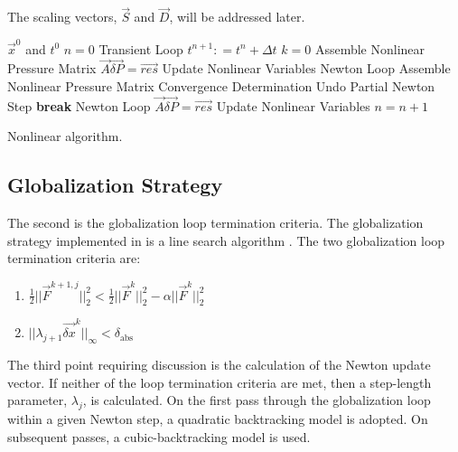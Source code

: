 The scaling vectors, $\vec{S}$ and $\vec{D}$, will be addressed later.


\begin{algo}[h!]
\setlength{\baselineskip}{0.625\baselineskip}
\begin{algorithmic}[1]
\Require $\vec{x}^{0}$ and $t^{0}$
\Set $n = 0$
\Loop \; Transient Loop
    \Set $t^{n+1} : = t^{n} + \Delta t$
    \Set $k = 0$
	\Algorithm Assemble Nonlinear Pressure Matrix	 
	\Solve $\vec{A} \vec{\delta P} = \vec{res}$
	\Algorithm Update Nonlinear Variables  
    \Loop \; Newton Loop
		\Algorithm Assemble Nonlinear Pressure Matrix 
		\Algorithm Convergence Determination 
			\Algorithm Undo Partial Newton Step 
			\State \textbf{break} Newton Loop 
		\EndIf		
		\Solve $\vec{A} \vec{\delta P} = \vec{res}$
		\Algorithm Update Nonlinear Variables 
	\EndLoop
	\Set $n = n + 1$
\EndLoop
\end{algorithmic}
\caption{Nonlinear \cobra{} algorithm.}
\label{alg:nlnCobraAlgorithm}
\end{algo}

\subsection{Globalization Strategy}
\label{subsect:nlnGlobalStrategy}


The second is the globalization loop termination criteria.
The globalization strategy implemented in \cobra{} is a line search algorithm \cite{Dennis1996}.
The two globalization loop termination criteria are:

\begin{enumerate}
\item{$\frac{1}{2}||\vec{F}^{k+1, j}||^{2}_{2} < \frac{1}{2}||\vec{F}^{k}||^{2}_{2} - \alpha ||\vec{F}^{k}||^{2}_{2}$ }
\item{$||\lambda_{j+1} \vec{\delta x}^{k}||_{\infty} < \delta_{\text{abs}}$}
\end{enumerate}


The third point requiring discussion is the calculation of the Newton update vector.
If neither of the loop termination criteria are met, then a step-length parameter, $\lambda_j$, is calculated.
On the first pass through the globalization loop within a given Newton step, a quadratic backtracking model is adopted.
On subsequent passes, a cubic-backtracking model is used.
 
